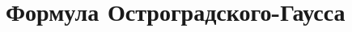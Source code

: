 \documentclass[12pt, a4paper]{article}
\begin{document}
\section{Формула Остроградского-Гаусса}
    
\end{document}
